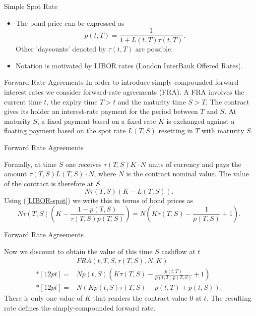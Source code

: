 {Simple Spot Rate}
\begin{itemize}
\item<1-> The bond price can be expressed as
$$
p(t,T)=\frac{1}{1+L(t,T)\tau(t,T)}.
$$
Other 'daycounts' denoted  by $\tau(t,T)$ are possible.
\item<2-> Notation is motivated by LIBOR rates (London InterBank Offered
Rates).
\end{itemize}





{Forward Rate Agreements}
In order to introduce simply-compounded forward interest rates we
consider forward-rate agreements (FRA). A FRA involves the current
time $t$, the expiry time $T>t$ and the maturity time $S>T$. The
contract gives its holder an interest-rate payment for the period
between $T$ and $S$. At maturity $S$, a fixed payment based on a
fixed rate $K$ is exchanged against a floating payment based on
the spot rate $L(T,S)$ resetting in $T$ with maturity $S$.


{Forward Rate Agreements}

Formally, at time $S$ one receives $\tau(T,S)K\cdot N$ units of
currency and pays the amount $\tau(T,S)L(T,S)\cdot N$, where $N$
is the contract nominal value. The value of the contract is
therefore at $S$
\begin{equation}\label{FRA-1}
N\tau(T,S)(K-L(T,S)).
\end{equation}
Using (\ref{LIBOR-spot})
we write this in terms of bond prices as
$$
N\tau(T,S)\left(K-\frac{1-p(T,S)}{\tau(T,S)p(T,S)}\right)=N\left(K\tau(T,S)-\frac{1}{p(T,S)}+1\right).
$$


{Forward Rate Agreements}

Now we discount to obtain the value of this time $S$ cashflow at
$t$
$$
\begin{array}{ll}
& FRA(t,T,S,\tau(T,S),N,K) \\*[12pt] = & Np(t,S)\left(K\tau(T,S)-\frac{p(t,T)}{p(t,T)p(T,S)}+1\right) \\*[12pt]
  = &N(K p(t,S)\tau(T,S)-p(t,T)+p(t,S)).
\end{array}
$$
There is only one value of $K$ that renders the contract value $0$
at $t$. The resulting rate defines the simply-compounded forward
rate.


